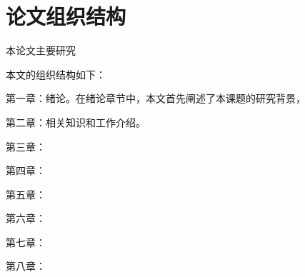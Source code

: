 \section{论文组织结构}
本论文主要研究

本文的组织结构如下：

第一章：绪论。在绪论章节中，本文首先阐述了本课题的研究背景，

第二章：相关知识和工作介绍。

第三章：

第四章：

第五章：

第六章：

第七章：

第八章：